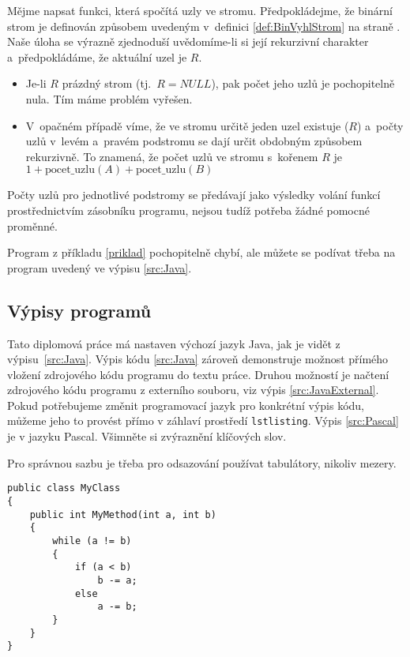\documentclass[bc,male,java,dept460]{diploma}		%
\begin{document}
\begin{example}
\label{priklad}
Mějme napsat funkci, která spočítá uzly ve stromu. Předpokládejme,
že binární strom je definován způsobem uvedeným v~definici
\ref{def:BinVyhlStrom} na straně \pageref{def:BinVyhlStrom}. Naše úloha se výrazně zjednoduší
uvědomíme-li si její rekurzivní charakter a~předpokládáme, že aktuální uzel je $R$.
\begin{itemize}
\item Je-li $R$ prázdný strom (tj.\ $R=NULL$), pak počet jeho uzlů je pochopitelně nula. Tím máme problém vyřešen.

\item V~opačném případě víme, že ve stromu  určitě jeden uzel existuje ($R$) a~počty uzlů
v~levém a~pravém podstromu se dají určit obdobným způsobem
rekurzivně. To znamená, že počet uzlů ve stromu s~kořenem $R$ je
$1 + \mathrm{pocet\_uzlu}(A) + \mathrm{pocet\_uzlu}(B)$
\end{itemize}

Počty uzlů pro jednotlivé podstromy se předávají jako výsledky
volání funkcí prostřednictvím zásobníku programu, nejsou tudíž
potřeba žádné pomocné proměnné.
\end{example}


\begin{remark}
Program z příkladu \ref{priklad} pochopitelně chybí,
ale můžete se podívat třeba na program uvedený ve výpisu \ref{src:Java}.
\end{remark}

\subsection{Výpisy programů}
Tato diplomová práce má nastaven výchozí jazyk Java, jak je vidět z výpisu~\ref{src:Java}. Výpis kódu \ref{src:Java} zároveň demonstruje možnost přímého vložení zdrojového kódu programu do textu práce. Druhou možností je načtení zdrojového kódu programu z externího souboru, viz výpis \ref{src:JavaExternal}. Pokud potřebujeme změnit programovací jazyk pro konkrétní výpis kódu, můžeme jeho to provést přímo v záhlaví prostředí \verb|lstlisting|. Výpis \ref{src:Pascal} je v jazyku Pascal. Všimněte si zvýraznění klíčových slov. 

\begin{remark}
Pro správnou sazbu je třeba pro odsazování používat tabulátory, nikoliv mezery.
\end{remark}


\begin{lstlisting}[label=src:Java,caption=Program v jazyce Java]
public class MyClass
{
	public int MyMethod(int a, int b)
	{
		while (a != b)
		{
			if (a < b)
				b -= a;
			else
				a -= b;
		}
	}
}
\end{lstlisting}
\end{document}
